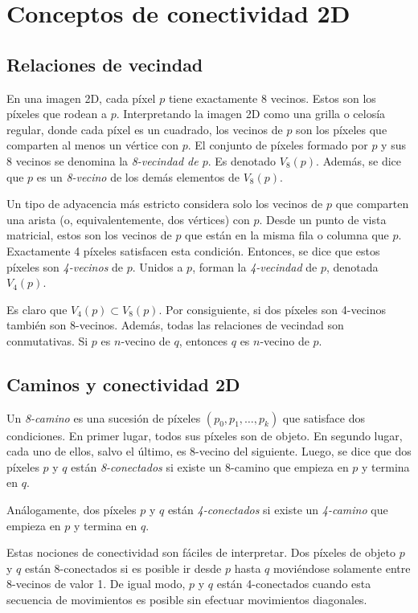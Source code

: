 \section{Conceptos de conectividad 2D}

\subsection{Relaciones de vecindad}
En una imagen 2D, cada píxel $p$ tiene exactamente 8 vecinos. Estos son los píxeles que rodean a $p$. Interpretando la imagen 2D como una grilla o celosía regular, donde cada píxel es un cuadrado, los vecinos de $p$ son los píxeles que comparten al menos un vértice con $p$. El conjunto de píxeles formado por $p$ y sus 8 vecinos se denomina la \textit{8-vecindad de $p$}. Es denotado $V_{8}(p)$. Además, se dice que $p$ es un \textit{8-vecino} de los demás elementos de $V_{8}(p)$.

Un tipo de adyacencia más estricto considera solo los vecinos de $p$ que comparten una arista (o, equivalentemente, dos vértices) con $p$. Desde un punto de vista matricial, estos son los vecinos de $p$ que están en la misma fila o columna que $p$. Exactamente 4 píxeles satisfacen esta condición. Entonces, se dice que estos píxeles son \textit{4-vecinos} de $p$. Unidos a $p$, forman la \textit{4-vecindad} de $p$, denotada $V_{4}(p)$. 

Es claro que $V_{4}(p) \subset V_{8}(p)$. Por consiguiente, si dos píxeles son 4-vecinos también son 8-vecinos. Además, todas las relaciones de vecindad son conmutativas. Si $p$ es $n$-vecino de $q$, entonces $q$ es $n$-vecino de $p$.

\subsection{Caminos y conectividad 2D} \label{conn2D}

Un \textit{8-camino} es una sucesión de píxeles $(p_{0}, p_{1}, \ldots, p_{k})$ que satisface dos condiciones. En primer lugar, todos sus píxeles son de objeto. En segundo lugar, cada uno de ellos, salvo el último, es 8-vecino del siguiente. Luego, se dice que dos píxeles $p$ y $q$ están \textit{8-conectados} si existe un 8-camino que empieza en $p$ y termina en $q$.

Análogamente, dos píxeles $p$ y $q$ están \textit{4-conectados} si existe un \textit{4-camino} que empieza en $p$ y termina en $q$.

Estas nociones de conectividad son fáciles de interpretar. Dos píxeles de objeto $p$ y $q$ están 8-conectados si es posible ir desde $p$ hasta $q$ moviéndose solamente entre 8-vecinos de valor 1. De igual modo, $p$ y $q$ están 4-conectados cuando esta secuencia de movimientos es posible sin efectuar movimientos diagonales.

